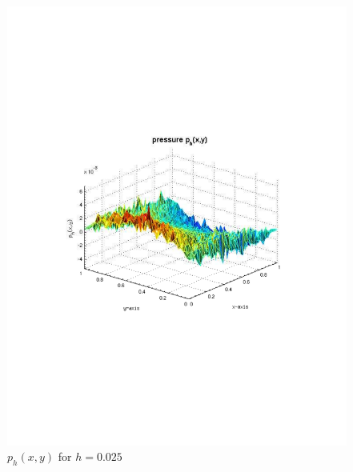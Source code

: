 \documentclass[12pt]{article}
\begin{document}
                \begin{figure}[htb]
                    \begin{center}
                \includegraphics[scale=0.50]{./../files/box/2p.pdf}
                \caption{$p_h(x,y)$ for $h = 0.025$}
            \end{center}
            \end{figure}
\end{document}
